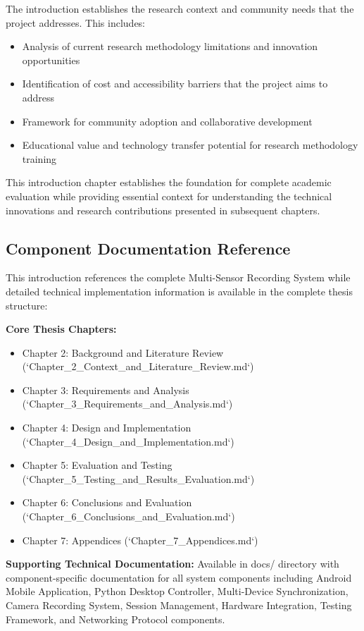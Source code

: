 \documentclass[11pt,a4paper]{article}
\begin{document}
The introduction establishes the research context and community needs that the
project addresses. This includes:

\begin{itemize}
\item Analysis of current research methodology limitations and innovation
opportunities
\item Identification of cost and accessibility barriers that the project aims to
address
\item Framework for community adoption and collaborative development
\item Educational value and technology transfer potential for research
methodology training

\end{itemize}
This introduction chapter establishes the foundation for complete academic
evaluation while providing essential
context for understanding the technical innovations and research contributions
presented in subsequent chapters.

\subsection{Component Documentation Reference}

This introduction references the complete Multi-Sensor Recording System while
detailed technical implementation
information is available in the complete thesis structure:

\textbf{Core Thesis Chapters:}

\begin{itemize}
\item Chapter 2: Background and Literature Review
(`Chapter_2_Context_and_Literature_Review.md`)
\item Chapter 3: Requirements and Analysis
(`Chapter_3_Requirements_and_Analysis.md`)
\item Chapter 4: Design and Implementation
(`Chapter_4_Design_and_Implementation.md`)
\item Chapter 5: Evaluation and Testing
(`Chapter_5_Testing_and_Results_Evaluation.md`)
\item Chapter 6: Conclusions and Evaluation
(`Chapter_6_Conclusions_and_Evaluation.md`)
\item Chapter 7: Appendices (`Chapter_7_Appendices.md`)

\end{itemize}
\textbf{Supporting Technical Documentation:}
Available in docs/ directory with component-specific documentation for
all system components including Android Mobile Application, Python Desktop
Controller, Multi-Device Synchronization,
Camera Recording System, Session Management, Hardware Integration, Testing
Framework, and Networking Protocol
components.
\end{document}
